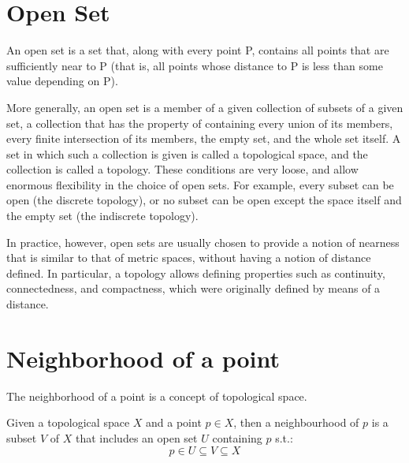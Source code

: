 \section{Open Set}
An open set is a set that, along with every point P, contains all points that are sufficiently near to P (that is, all points whose distance to P is less than some value depending on P).\par
More generally, an open set is a member of a given collection of subsets of a given set, a collection that has the property of containing every union of its members, every finite intersection of its members, the empty set, and the whole set itself. A set in which such a collection is given is called a topological space, and the collection is called a topology. These conditions are very loose, and allow enormous flexibility in the choice of open sets. For example, every subset can be open (the discrete topology), or no subset can be open except the space itself and the empty set (the indiscrete topology).\par
In practice, however, open sets are usually chosen to provide a notion of nearness that is similar to that of metric spaces, without having a notion of distance defined. In particular, a topology allows defining properties such as continuity, connectedness, and compactness, which were originally defined by means of a distance. 

\section{Neighborhood of a point}
The neighborhood of a point is a concept of topological space.\par
Given a topological space $X$ and a point $p \in X$, then a neighbourhood of $p$ is a subset $V$ of $X$ that includes an open set $U$ containing $p$ s.t.:
\begin{equation*}
    p \in U \subseteq V \subseteq X
\end{equation*}